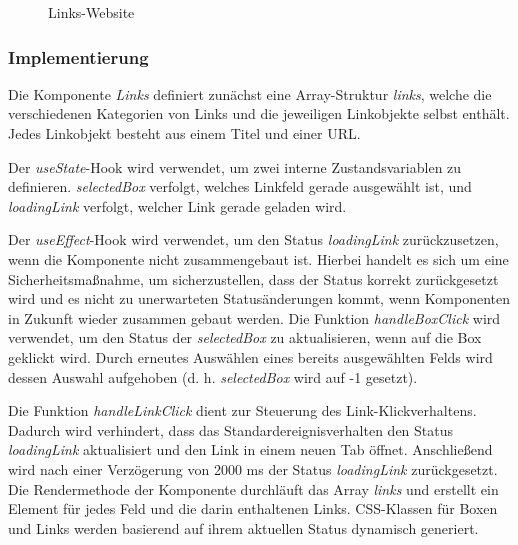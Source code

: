 \begin{figure}[htbp]
	\centering
	\caption{Links-Website}
\end{figure}
\newpage
\subsubsection{Implementierung}
Die Komponente \emph{Links} definiert zunächst eine Array-Struktur \emph{links}, welche die verschiedenen Kategorien von Links und die jeweiligen Linkobjekte selbst enthält. Jedes Linkobjekt besteht aus einem Titel und einer URL.

Der \emph{useState}-Hook wird verwendet, um zwei interne Zustandsvariablen zu definieren. \emph{selectedBox} verfolgt, welches Linkfeld gerade ausgewählt ist, und \emph{loadingLink} verfolgt, welcher Link gerade geladen wird.

Der \emph{useEffect}-Hook wird verwendet, um den Status \emph{loadingLink} zurückzusetzen, wenn die Komponente nicht zusammengebaut ist. Hierbei handelt es sich um eine Sicherheitsmaßnahme, um sicherzustellen, dass der Status korrekt zurückgesetzt wird und es nicht zu unerwarteten Statusänderungen kommt, wenn Komponenten in Zukunft wieder zusammen gebaut werden. Die Funktion \emph{handleBoxClick} wird verwendet, um den Status der \emph{selectedBox} zu aktualisieren, wenn auf die Box geklickt wird. Durch erneutes Auswählen eines bereits ausgewählten Felds wird dessen Auswahl aufgehoben (d. h. \emph{selectedBox} wird auf -1 gesetzt).

Die Funktion \emph{handleLinkClick} dient zur Steuerung des Link-Klickverhaltens. Dadurch wird verhindert, dass das Standardereignisverhalten den Status \emph{loadingLink} aktualisiert und den Link in einem neuen Tab öffnet. Anschließend wird nach einer Verzögerung von 2000 ms der Status \emph{loadingLink} zurückgesetzt. Die Rendermethode der Komponente durchläuft das Array \emph{links} und erstellt ein Element für jedes Feld und die darin enthaltenen Links. CSS-Klassen für Boxen und Links werden basierend auf ihrem aktuellen Status dynamisch generiert.

